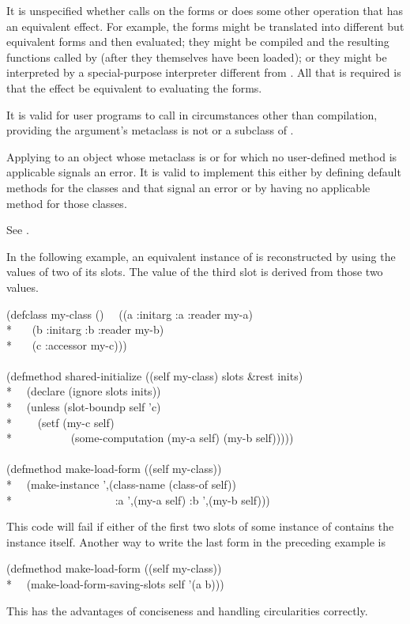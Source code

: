 \begin{newer}
\begin{defun}
  It is unspecified whether  calls  on the forms or does some
  other operation that has an equivalent effect.  For example, the
  forms might be translated into different but equivalent forms and
  then evaluated; they might be compiled and the resulting functions
  called by  (after they themselves have been loaded);
  or they might be interpreted by a special-purpose
  interpreter different from .  All that is required is that the
  effect be equivalent to evaluating the forms.

  It is valid for user programs to call  in
  circumstances other than compilation, providing the argument's
  metaclass is not  or a subclass of .

  Applying  to an object whose metaclass is  or
   for which no user-defined method is applicable signals
  an error.  It is valid to implement this either by defining default
  methods for the classes  and  that signal an error
  or by having no applicable method for those classes.

See .

In the following example, an equivalent instance of  is reconstructed
  by using the values of two of its slots.  The value of the third slot
  is derived from those two values.
\begin{lisp}
(defclass my-class ()
~~((a :initarg :a :reader my-a) \\*
~~~(b :initarg :b :reader my-b) \\*
~~~(c :accessor my-c))) \\
\\
(defmethod shared-initialize ((self my-class) slots \&rest inits) \\*
~~(declare (ignore slots inits)) \\*
~~(unless (slot-boundp self 'c) \\*
~~~~(setf (my-c self) \\*
~~~~~~~~~~(some-computation (my-a self) (my-b self))))) \\
\\
(defmethod make-load-form ((self my-class)) \\*
~~{\Xbq}(make-instance ',(class-name (class-of self)) \\*
~~~~~~~~~~~~~~~~~~:a ',(my-a self) :b ',(my-b self)))
\end{lisp}
This code will fail if either of the first two slots of some instance
of  contains the instance itself.
Another way to write the last form in the preceding example is
\begin{lisp}
(defmethod make-load-form ((self my-class)) \\*
~~(make-load-form-saving-slots self '(a b)))
\end{lisp}
This has the advantages of conciseness and handling circularities correctly.


\end{defun}
\end{newer}
